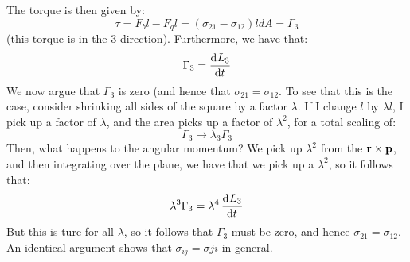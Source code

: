 The torque is then given by:
\[\tau = F_b l - F_q l = (\sigma_{21} - \sigma_{12})ldA = \Gamma_3\]
(this torque is in the 3-direction). Furthermore, we have that:
\[\Gamma_3 = \dod{L_3}{t}\]
We now argue that $\Gamma_3$ is zero (and hence that $\sigma_{21} = \sigma_{12}$. To see that this is the case, consider shrinking all sides of the square by a factor $\lambda$. If I change $l$ by $\lambda l$, I pick up a factor of $\lambda$, and the area picks up a factor of $\lambda^2$, for a total scaling of:
\[\Gamma_3 \mapsto \lambda_3 \Gamma_3\]
Then, what happens to the angular momentum? We pick up $\lambda^2$ from the $\mathbf{r} \times \mathbf{p}$, and then integrating over the plane, we have that we pick up a $\lambda^2$, so it follows that:
\[\lambda^3\Gamma_3 = \lambda^4\dod{L_3}{t}\]
But this is ture for all $\lambda$, so it follows that $\Gamma_3$ must be zero, and hence $\sigma_{21} = \sigma_{12}$. An identical argument shows that $\sigma_{ij} = \sigma{ji}$ in general.

